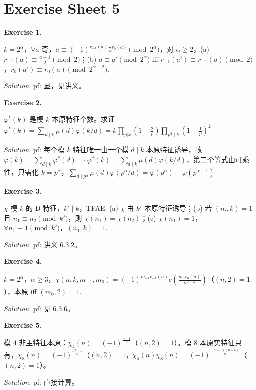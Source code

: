 \documentclass[
	colors = true,
	geometry = b5,
	fontsetup = font-setup-overleaf.tex,
	titlesetup = titles-setup.tex
]{AJbook}
\newenvironment{sheetexercise}[1]{%
	\par\medskip
	\noindent\textbf{Exercise #1.}\enspace
}{%
	\par\smallskip
}
\newenvironment{solution}{%
	\par\smallskip
	\noindent\textit{Solution.}\enspace
}{%
	\par\smallskip
}
\begin{document}
\chapter{Exercise Sheet 5}
\begin{sheetexercise}{1}
$k=2^\alpha$，$\forall a$ 奇，$a\equiv(-1)^{r_{-1}(a)}5^{r_0(a)}\pmod{2^\alpha}$，对 $\alpha\geq2$，(a) $r_{-1}(a)\equiv\frac{a-1}2\pmod2$；(b) $a\equiv a'\pmod{2^\alpha}$ iff $r_{-1}(a')\equiv r_{-1}(a)\pmod2$，$r_0(a')\equiv r_0(a)\pmod{2^{\alpha-2}}$.
\end{sheetexercise}
\begin{solution}pf: 显，见讲义。\end{solution}

\begin{sheetexercise}{2}
$\varphi^\ast(k)$ 是模 $k$ 本原特征个数。求证 $\varphi^\ast(k)=\sum_{d\mid k}\mu(d)\varphi(k/d)=k\prod_{p\Vert k}(1-\frac2p)\prod_{p^2\mid k}(1-\frac1p)^2$.
\end{sheetexercise}
\begin{solution}pf: 每个模 $k$ 特征唯一由一个模 $d\mid k$ 本原特征诱导，故 $\varphi(k)=\sum_{d\mid k}\varphi^\ast(d)\Rightarrow\varphi^\ast(k)=\sum_{d\mid k}\mu(d)\varphi(k/d)$，第二个等式由可乘性，只需化 $k=p^\alpha$，$\sum_{d\mid p^\alpha}\mu(d)\varphi(p^\alpha/d)=\varphi(p^\alpha)-\varphi(p^{\alpha-1})$\end{solution}

\begin{sheetexercise}{3}
$\chi$ 模 $k$ 的 D 特征，$k'\mid k$，TFAE: (a) $\chi$ 由 $k'$ 本原特征诱导；(b) 若 $(n_i,k)=1$ 且 $n_1\equiv n_2\pmod{k'}$，则 $\chi(n_1)=\chi(n_2)$；(c) $\chi(n_1)=1$，$\forall n_1\equiv1\pmod{k'}$，$(n_1,k)=1$.
\end{sheetexercise}
\begin{solution}pf: 讲义 6.3.2。\end{solution}

\begin{sheetexercise}{4}
$k=2^\alpha$，$\alpha\geq3$，$\chi(n,k,m_{-1},m_0)=(-1)^{m_{-1}r_{-1}(n)}e(\frac{m_0r_0(n)}{2^{\alpha-2}})$（$(n,2)=1$），本原 iff $(m_0,2)=1$.
\end{sheetexercise}
\begin{solution}pf: 见 6.3.6。\end{solution}

\begin{sheetexercise}{5}
模 $4$ 非主特征本原：$\chi_4(n)=(-1)^{\frac{n-1}2}$（$(n,2)=1$）。模 $8$ 本原实特征只有，$\chi_8(n)=(-1)^{\frac{n^2-1}8}$（$(n,2)=1$，$\chi_4(n)\chi_8(n)=(-1)^{\frac{(n-1)(n+5)}8}$（$(n,2)=1$）。
\end{sheetexercise}
\begin{solution}pf: 直接计算。\end{solution}
\end{document}
